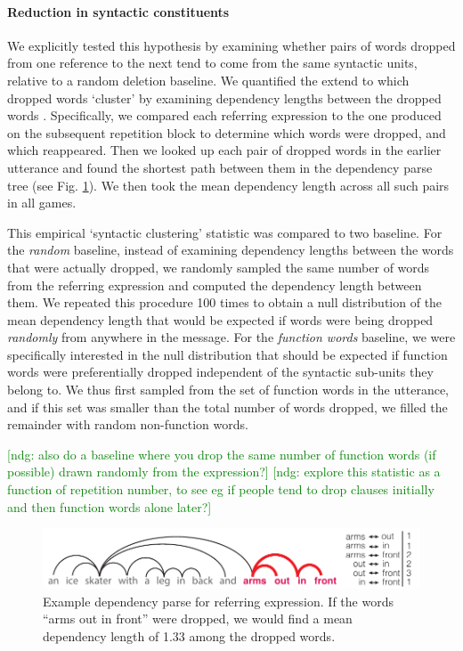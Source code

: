 \documentclass[alpha-refs]{wiley-article}
\newcommand{\ndg}[1]{\textcolor{green}{[ndg: #1]}}
\begin{document}
\paragraph{Reduction in syntactic constituents} 
We explicitly tested this hypothesis by examining whether pairs of words dropped from one reference to the next tend to come from the same syntactic units, relative to a random deletion baseline.
We quantified the extend to which dropped words `cluster' by examining dependency lengths between the dropped words \citep{jurafsky2014speech,futrell2015large}.
Specifically, we compared each referring expression to the one produced on the subsequent repetition block to determine which words were dropped, and which reappeared.
Then we looked up each pair of dropped words in the earlier utterance and found the shortest path between them in the dependency parse tree (see Fig. \ref{fig:dependency}).
We then took the mean dependency length across all such pairs in all games.

This empirical `syntactic clustering' statistic was compared to two baseline.
For the \emph{random} baseline, instead of examining dependency lengths between the words that were actually dropped, we randomly sampled the same number of words from the referring expression and computed the dependency length between them.
We repeated this procedure 100 times to obtain a null distribution of the mean dependency length that would be expected if words were being dropped \emph{randomly} from anywhere in the message.
For the \emph{function words} baseline, we were specifically interested in the null distribution that should be expected if function words were preferentially dropped independent of the syntactic sub-units they belong to.
We thus first sampled from the set of function words in the utterance, and if this set was smaller than the total number of words dropped, we filled the remainder with random non-function words. 

\ndg{also do a baseline where you drop the same number of function words (if possible) drawn randomly from the expression?}
\ndg{explore this statistic as a function of repetition number, to see eg if people tend to drop clauses initially and then function words alone later?}

\begin{figure}[t!]
\centering
\includegraphics[scale=.8]{dependency.pdf}
\caption{Example dependency parse for referring expression. If the words ``arms out in front'' were dropped, we would find a mean dependency length of 1.33 among the dropped words.} 
\label{fig:dependency}
\end{figure}
\end{document}

